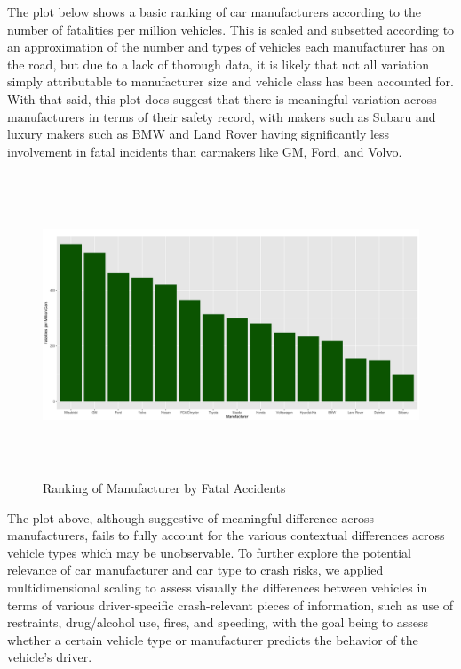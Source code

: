 \documentclass[11pt, oneside,titlepage]{article}   	%
\begin{document}
The plot below shows a basic ranking of car manufacturers according to the number of fatalities per million vehicles. This is scaled and subsetted according to an approximation of the number and types of vehicles each manufacturer has on the road, but due to a lack of thorough data, it is likely that not all variation simply attributable to manufacturer size and vehicle class has been accounted for. With that said, this plot does suggest that there is meaningful variation across manufacturers in terms of their safety record, with makers such as Subaru and luxury makers such as BMW and Land Rover having significantly less involvement in fatal incidents than carmakers like GM, Ford, and Volvo.
\\
\begin{figure}[H]
\begin{center}
\includegraphics[width=.9\textwidth,height=9cm,keepaspectratio]{ManufacturerRankingPlot.png}
\end{center}
\caption{Ranking of Manufacturer by Fatal Accidents}
\end{figure}

The plot above, although suggestive of meaningful difference across manufacturers, fails to fully account for the various contextual differences across vehicle types which may be unobservable. To further explore the potential relevance of car manufacturer and car type to crash risks, we applied multidimensional scaling to assess visually the differences between vehicles in terms of various driver-specific crash-relevant pieces of information, such as use of restraints, drug/alcohol use, fires, and speeding, with the goal being to assess whether a certain vehicle type or manufacturer predicts the behavior of the vehicle's driver.\\
\end{document}
